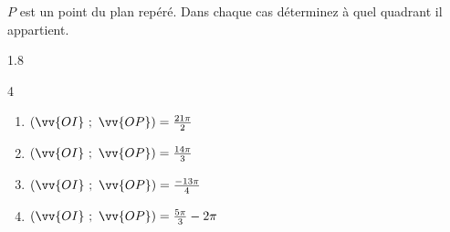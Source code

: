 \documentclass[main.tex]{subfiles}
\begin{document}
\begin{exercise} $P$ est un point du plan repéré. Dans chaque cas déterminez à quel quadrant il appartient.
	\vspace{-1em}
	\begin{spacing}{1.8}
		\begin{multicols}{4} 
			\begin{enumerate}[label={\arabic*)},leftmargin=*] 
				\item  $(\vv{OI}~;~\vv{OP})=\tfrac{21\pi}{2}$
				\item  $(\vv{OI}~;~\vv{OP})=\tfrac{14\pi}{3}$
				\item  $(\vv{OI}~;~\vv{OP})=\tfrac{-13\pi}{4}$
				\item  $(\vv{OI}~;~\vv{OP})=\tfrac{5\pi}{3}-2\pi$
			\end{enumerate}
		\end{multicols}\vspace{-2.5em}
	\end{spacing} 
\end{exercise}

%	 
\newpage 
{}  
\pagestyle{scrheadings} %
\onehalfspacing 
\end{document}
